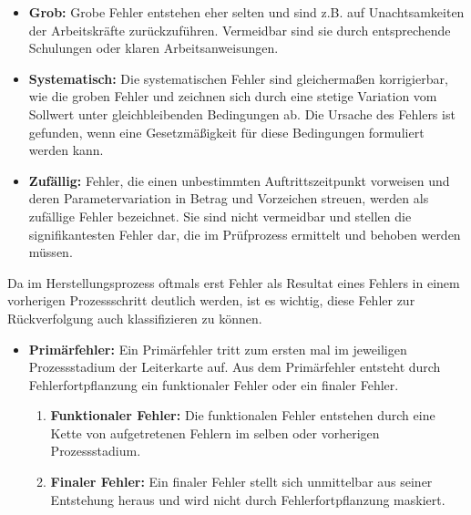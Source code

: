         \begin{itemize}
            \item \textbf{Grob:} Grobe Fehler entstehen eher selten und sind z.B. auf Unachtsamkeiten der Arbeitskräfte zurückzuführen. Vermeidbar sind sie durch entsprechende Schulungen oder klaren Arbeitsanweisungen. \cite{karger_pruftechnik_1985}
            \item \textbf{Systematisch:} Die systematischen Fehler sind gleichermaßen korrigierbar, wie die groben Fehler und zeichnen sich durch eine stetige Variation vom Sollwert unter gleichbleibenden Bedingungen ab. Die Ursache des Fehlers ist gefunden, wenn eine Gesetzmäßigkeit für diese Bedingungen formuliert werden kann. \cite{karger_pruftechnik_1985} 
            \item \textbf{Zufällig:} Fehler, die einen unbestimmten Auftrittszeitpunkt vorweisen und deren Parametervariation in Betrag und Vorzeichen streuen, werden als zufällige Fehler bezeichnet. Sie sind nicht vermeidbar und stellen die signifikantesten Fehler dar, die im Prüfprozess ermittelt und behoben werden müssen. \cite{karger_pruftechnik_1985}
        \end{itemize}

        Da im Herstellungsprozess oftmals erst Fehler als Resultat eines Fehlers in einem vorherigen Prozessschritt deutlich werden, ist es wichtig, diese Fehler zur Rückverfolgung auch klassifizieren zu können.

        \begin{itemize}
            \item \textbf{Primärfehler:} Ein Primärfehler tritt zum ersten mal im jeweiligen Prozessstadium der Leiterkarte auf. Aus dem Primärfehler entsteht durch Fehlerfortpflanzung ein funktionaler Fehler oder ein finaler Fehler. \cite{karger_pruftechnik_1985}
            \begin{enumerate}
                \item \textbf{Funktionaler Fehler:} Die funktionalen Fehler entstehen durch eine Kette von aufgetretenen Fehlern im selben oder vorherigen Prozessstadium. \cite{karger_pruftechnik_1985}
                \item \textbf{Finaler Fehler:} Ein finaler Fehler stellt sich unmittelbar aus seiner Entstehung heraus und wird nicht durch Fehlerfortpflanzung maskiert. \cite{karger_pruftechnik_1985}
            \end{enumerate}
        \end{itemize}

